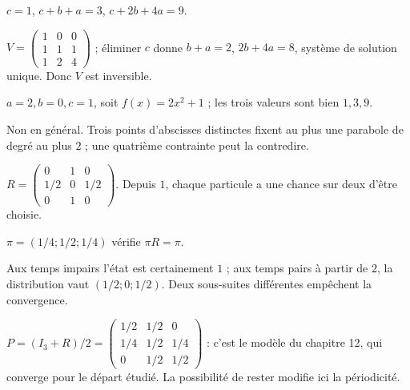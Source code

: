 \par\addvspace{6mm}\label{projet-cor-7}
\begin{questions}
\item $c=1$, $c+b+a=3$, $c+2b+4a=9$.
\item $V=\begin{pmatrix}1&0&0\\1&1&1\\1&2&4\end{pmatrix}$ ; éliminer $c$ donne $b+a=2$, $2b+4a=8$, système de solution unique. Donc $V$ est inversible.
\item $a=2,b=0,c=1$, soit $f(x)=2x^2+1$ ; les trois valeurs sont bien $1,3,9$.
\item Non en général. Trois points d’abscisses distinctes fixent au plus une parabole de degré au plus $2$ ; une quatrième contrainte peut la contredire.
\end{questions}
\par\addvspace{6mm}\label{projet-cor-8}
\begin{questions}
\item $R=\begin{pmatrix}0&1&0\\1/2&0&1/2\\0&1&0\end{pmatrix}$. Depuis $1$, chaque particule a une chance sur deux d’être choisie.
\item $\pi=(1/4;1/2;1/4)$ vérifie $\pi R=\pi$.
\item Aux temps impairs l’état est certainement $1$ ; aux temps pairs à partir de $2$, la distribution vaut $(1/2;0;1/2)$. Deux sous-suites différentes empêchent la convergence.
\item $P=(I_3+R)/2=\left(\begin{smallmatrix}1/2&1/2&0\\1/4&1/2&1/4\\0&1/2&1/2\end{smallmatrix}\right)$ : c’est le modèle du chapitre 12, qui converge pour le départ étudié. La possibilité de rester modifie ici la périodicité.
\end{questions}
\par\addvspace{6mm}\label{projet-cor-9}
